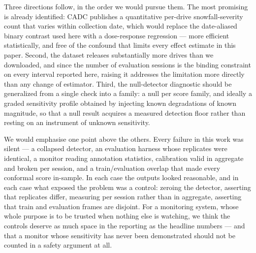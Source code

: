 Three directions follow, in the order we would pursue them. The most
promising is already identified: CADC publishes a quantitative per-drive
snowfall-severity count that varies within collection date, which would
replace the date-aliased binary contrast used here with a dose-response
regression --- more efficient statistically, and free of the confound that
limits every effect estimate in this paper. Second, the dataset releases
substantially more drives than we downloaded, and since the number of
evaluation sessions is the binding constraint on every interval reported
here, raising it addresses the limitation more directly than any change of
estimator. Third, the null-detector diagnostic should be generalized from a
single check into a family: a null per score family, and ideally a graded
sensitivity profile obtained by injecting known degradations of known
magnitude, so that a null result acquires a measured detection floor rather
than resting on an instrument of unknown sensitivity.

We would emphasise one point above the others. Every failure in this work
was silent --- a collapsed detector, an evaluation harness whose replicates
were identical, a monitor reading annotation statistics, calibration valid
in aggregate and broken per session, and a train/evaluation overlap that
made every conformal score in-sample. In each case the outputs looked
reasonable, and in each case what exposed the problem was a control:
zeroing the detector, asserting that replicates differ, measuring per
session rather than in aggregate, asserting that train and evaluation
frames are disjoint. For a monitoring system, whose whole purpose is to be
trusted when nothing else is watching, we think the controls deserve as
much space in the reporting as the headline numbers --- and that a
monitor whose sensitivity has never been demonstrated should not be counted
in a safety argument at all.
